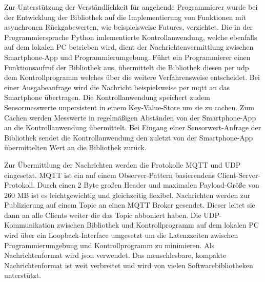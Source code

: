 \documentclass[11pt,a4paper]{report}
\begin{document}
Zur Unterstützung der Verständlichkeit für angehende Programmierer wurde bei der Entwicklung der Bibliothek auf die Implementierung von Funktionen mit asynchronen Rückgabewerten, wie beispielsweise Futures, verzichtet.
Die in der Programmiersprache Python imlementierte Kontrollanwendung, welche ebenfalls auf dem lokalen PC betrieben wird, dient der Nachrichtenvermittlung zwischen Smartphone-App und Programmierumgebung.
Führt ein Programmierer einen Funktionsaufruf der Bibliothek aus, übermittelt die Bibliothek diesen per \acrshort{udp} dem Kontrollprogramm welches über die weitere Verfahrensweise entscheidet.
Bei einer Ausgabeanfrage wird die Nachricht beispielsweise per \acrshort{mqtt} an das Smartphone übertragen.
Die Kontrollanwendung speichert zudem Sensormesswerte unpersistent in einem Key-Value-Store um sie zu cachen.
Zum Cachen werden Messwerte in regelmäßigen Abständen von der Smartphone-App an die Kontrollanwendung übermittelt.
Bei Eingang einer Sensorwert-Anfrage der Bibliothek sendet die Kontrollanwendung den zuletzt von der Smartphone-App übermittelten Wert an die Bibliothek zurück.

Zur Übermittlung der Nachrichten werden die Protokolle MQTT und UDP eingesetzt.
MQTT ist ein auf einem Observer-Pattern basierendens Client-Server-Protokoll.
Durch einen 2 Byte großen Header und maximalen Payload-Größe von 260 MB ist es leichtgewichtig und gleichzeitig flexibel.
Nachrichten werden zur Publizierung auf einem Topic an einen MQTT Broker gesendet.
Dieser leitet sie dann an alle Clients weiter die das Topic abboniert haben.
Die UDP-Kommunikation zwischen Bibliothek und Kontrollprogramm auf dem lokalen PC wird über ein Loopback-Interface umgesetzt um die Latenzzeiten zwischen Programmierumgebung und Kontrollprogramm zu minimieren.
Als Nachrichtenformat wird \acrshort{json} verwendet.
Das menschlesbare, kompakte Nachrichtenformat ist weit verbreitet und wird von vielen Softwarebibliotheken unterstützt.
\end{document}
